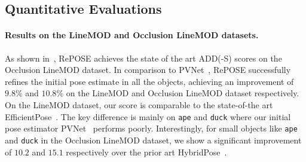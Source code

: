 \documentclass[10pt,twocolumn,letterpaper]{article}
\begin{document}
\begin{table}[t]
\small
\centering
\caption{Comparison of RePOSE on Occlusion LineMOD dataset with recent methods including PVNet~\cite{peng2019pvnet}, DPOD~\cite{Zakharov_2019_ICCV}, and HybridPose~\cite{Song_2020_CVPR} using the ADD(-S) score. Note, we exclude EfficientPose~\cite{bukschat2020efficientpose} as it is trained on the Occlusion LineMOD dataset. \# of wins denotes in how many objects the method achieves the best score.}
\label{tab:result_of_occlusion_linemod}
\end{table}

\subsection{Quantitative Evaluations}

\paragraph{Results on the LineMOD and Occlusion LineMOD datasets.}
As shown in~, RePOSE achieves the state of the art ADD(-S) scores on the Occlusion LineMOD dataset. In comparison to PVNet~\cite{peng2019pvnet}, RePOSE successfully refines the initial pose estimate in all the objects, achieving an improvement of $9.8$\% and $10.8$\% on the LineMOD and Occlusion LineMOD dataset respectively. On the LineMOD dataset, our score is comparable to the state-of-the art EfficientPose~\cite{bukschat2020efficientpose}. The key difference is mainly on \texttt{ape} and \texttt{duck} where our initial pose estimator PVNet~\cite{peng2019pvnet} performs poorly. Interestingly, for small objects like \texttt{ape} and \texttt{duck} in the Occlusion LineMOD dataset, we show a significant improvement of $10.2$ and $15.1$ respectively over the prior art HybridPose~\cite{Song_2020_CVPR}.
\end{document}
